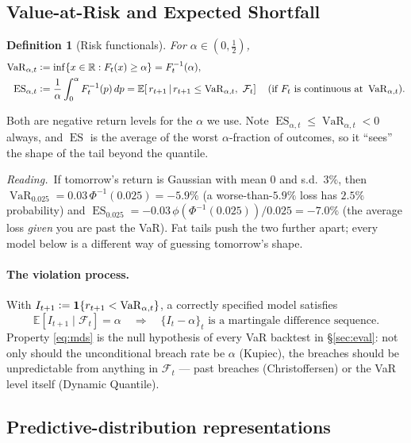 \documentclass[11pt,a4paper]{article}
\newcommand{\R}{\mathbb{R}}
\newcommand{\E}{\mathbb{E}}
\newcommand{\Ind}[1]{\mathbf{1}\!\left\{#1\right\}}
\newcommand{\VaR}{\operatorname{VaR}}
\newcommand{\ES}{\operatorname{ES}}
\newcommand{\Fcal}{\mathcal{F}}
\newcommand{\eqdef}{\mathrel{\vcentcolon=}}
\newtheorem{definition}{Definition}
\newcommand{\intuition}[1]{\par\smallskip\noindent\textit{Reading.}\ #1\par\smallskip}
\begin{document}
\subsection{Value-at-Risk and Expected Shortfall}

\begin{definition}[Risk functionals]
For $\alpha\in(0,\tfrac12)$,
\begin{align}
  \VaR_{\alpha,t}
    &\eqdef \inf\{x\in\R : F_t(x) \ge \alpha\}
     = F_t^{-1}(\alpha), \\
  \ES_{\alpha,t}
    &\eqdef \frac{1}{\alpha}\int_0^\alpha F_t^{-1}(p)\,dp
     = \E\!\left[\,r_{t+1}\,\middle|\, r_{t+1}\le \VaR_{\alpha,t},\ \Fcal_t\right]
       \quad (\text{if } F_t \text{ is continuous at } \VaR_{\alpha,t}).
\end{align}
\end{definition}
Both are negative return levels for the $\alpha$ we use. Note $\ES_{\alpha,t}\le
\VaR_{\alpha,t} < 0$ always, and $\ES$ is the average of the worst $\alpha$-fraction
of outcomes, so it ``sees'' the shape of the tail beyond the quantile.

\intuition{If tomorrow's return is Gaussian with mean $0$ and s.d.\ $3\%$, then
$\VaR_{0.025}= 0.03\,\Phi^{-1}(0.025)= -5.9\%$ (a worse-than-$5.9\%$ loss has
$2.5\%$ probability) and $\ES_{0.025}= -0.03\,\phi(\Phi^{-1}(0.025))/0.025 =
-7.0\%$ (the average loss \emph{given} you are past the VaR). Fat tails push the
two further apart; every model below is a different way of guessing tomorrow's
shape.}

\paragraph{The violation process.} With
$I_{t+1}\eqdef\Ind{r_{t+1} < \VaR_{\alpha,t}}$, a correctly specified model
satisfies
\begin{equation}
  \E[I_{t+1}\mid\Fcal_t] = \alpha
  \quad\Longrightarrow\quad
  \{I_t - \alpha\}_{t} \text{ is a martingale difference sequence.}
  \label{eq:mds}
\end{equation}
Property \eqref{eq:mds} is the null hypothesis of every VaR backtest in
\S\ref{sec:eval}: not only should the unconditional breach rate be $\alpha$
(Kupiec), the breaches should be unpredictable from anything in $\Fcal_t$ ---
past breaches (Christoffersen) or the VaR level itself (Dynamic Quantile).

\subsection{Predictive-distribution representations}
\end{document}
